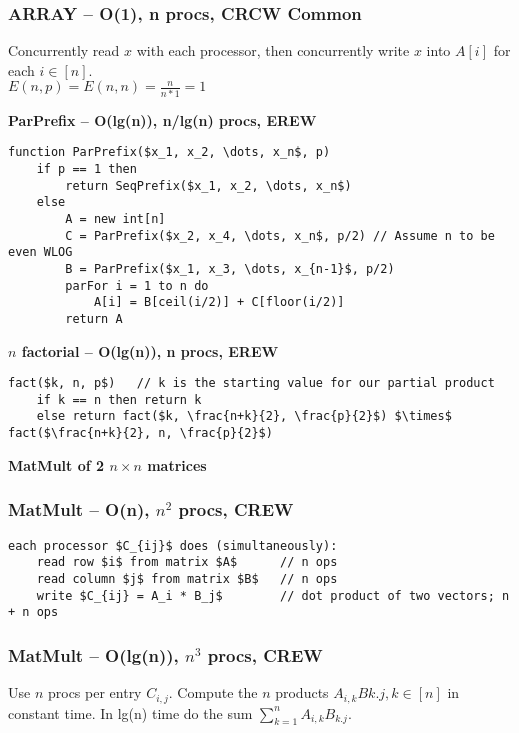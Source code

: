 \documentclass[12pt]{article}
\begin{document}
\subsubsection*{ARRAY -- O(1), n procs, CRCW Common}
Concurrently read $x$ with each processor, then concurrently write $x$ into $A[i]$ for each $i \in [n]$.\\
$E(n,p) = E(n,n) = \frac{n}{n*1} = 1$


\begin{centering}\textbf{ParPrefix -- O(lg(n)), n/lg(n) procs, EREW}\par\end{centering}
\begin{lstlisting}
function ParPrefix($x_1, x_2, \dots, x_n$, p)
    if p == 1 then
        return SeqPrefix($x_1, x_2, \dots, x_n$)
    else
        A = new int[n]
        C = ParPrefix($x_2, x_4, \dots, x_n$, p/2) // Assume n to be even WLOG
        B = ParPrefix($x_1, x_3, \dots, x_{n-1}$, p/2)
        parFor i = 1 to n do
            A[i] = B[ceil(i/2)] + C[floor(i/2)]
        return A
\end{lstlisting}



\begin{centering}\textbf{$n$ factorial -- O(lg(n)), n procs, EREW}\par\end{centering}
\begin{lstlisting}
fact($k, n, p$)   // k is the starting value for our partial product
    if k == n then return k
    else return fact($k, \frac{n+k}{2}, \frac{p}{2}$) $\times$ fact($\frac{n+k}{2}, n, \frac{p}{2}$)
\end{lstlisting}



\begin{centering}\textbf{MatMult of 2 $n\times n$ matrices}\par\end{centering}
\subsubsection*{MatMult -- O(n), $n^2$ procs, CREW}
\begin{lstlisting}
each processor $C_{ij}$ does (simultaneously):
    read row $i$ from matrix $A$      // n ops
    read column $j$ from matrix $B$   // n ops
    write $C_{ij} = A_i * B_j$        // dot product of two vectors; n + n ops
\end{lstlisting}
\subsubsection*{MatMult -- O(lg(n)), $n^3$ procs, CREW}
Use $n$ procs per entry $C_{i,j}$.
Compute the $n$ products $A_{i,k}B{k.j}, k\in [n]$ in constant time.
In lg(n) time do the sum $\sum_{k=1}^n A_{i,k}B_{k.j}$.
\end{document}

